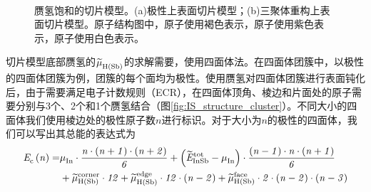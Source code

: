 \begin{figure}[htb]
    \\[-0.5ex]
    \caption{赝氢饱和的切片模型。(a)极性上表面切片模型；(b)三聚体重构上表面切片模型。原子结构图中，原子使用褐色表示，原子使用紫色表示，原子使用白色表示。}
    \label{fig:IS_structure_slab_pseH}
\end{figure}


切片模型底部赝氢的$\it \widetilde{\mu}_{\rm H\left(Sb\right)}^{\rm } \it$的求解需要，使用四面体法。在四面体团簇中，以极性的四面体团簇为例，团簇的每个面均为极性。使用赝氢对四面体团簇进行表面钝化后，由于需要满足电子计数规则（ECR），在四面体顶角、棱边和片面处的原子需要分别与3个、2个和1个赝氢结合（图\ref{fig:IS_structure_cluster}）。不同大小的四面体我们使用棱边处的极性原子数$n$进行标识。对于大小为$n$的极性的四面体，我们可以写出其总能的表达式为\chinesecolon
\begin{equation}
    \label{eq:IS_cluster_totEnergy}
    \begin{split}
        \it E_{\rm c}^{\rm } \it\left(n\right)=&\it \mu_{\rm In}^{\rm } \it \cdot \frac{n\cdot \left(n+1\right) \cdot \left(n+2\right)}{6} +\left(\it \widetilde{E}_{\rm InSb}^{\rm tot} \it-\it \mu_{\rm In}^{\rm } \it\right)\cdot \frac{\left(n-1\right)\cdot n \cdot \left(n+1\right)}{6}\\
        &+\it \widetilde{\mu}_{\rm H\left(Sb\right)}^{\rm corner} \it\cdot 12 + \it \widetilde{\mu}_{\rm H\left(Sb\right)}^{\rm edge} \it\cdot 12 \cdot \left(n-2\right) + \it \widetilde{\mu}_{\rm H\left(Sb\right)}^{\rm face} \it\cdot 2 \cdot (n-2) \cdot (n-3)
    \end{split}
\end{equation}

